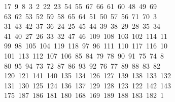 \begin{tabbing}
\>\ 17\ 9\ 8\ 3\ 2\ 22\ 23\ 54\ 55\ 67\ 66\ 61\ 60\ 48\ 49\ 69\ \\[0pt]
\ 63\ 62\ 53\ 52\ 59\ 58\ 65\ 64\ 51\ 50\ 57\ 56\ 71\ 70\ 3\\[0pt]
\ 31\ 43\ 42\ 37\ 36\ 24\ 25\ 45\ 44\ 39\ 38\ 29\ 28\ 35\ 34\\[0pt]
\>\ 41\ 40\ 27\ 26\ 33\ 32\ 47\ 46\ 109\ 108\ 103\ 102\ 114\ 11\\[0pt]
\ 99\ 98\ 105\ 104\ 119\ 118\ 97\ 96\ 111\ 110\ 117\ 116\ 10\\[0pt]
\ 101\ 113\ 112\ 107\ 106\ 85\ 84\ 79\ 78\ 90\ 91\ 75\ 74\ 8\\[0pt]
\ 80\ 95\ 94\ 73\ 72\ 87\ 86\ 93\ 92\ 76\ 77\ 89\ 88\ 83\ 82\\[0pt]
\>\ 120\ 121\ 141\ 140\ 135\ 134\ 126\ 127\ 139\ 138\ 133\ 132\\[0pt]
\>\ 131\ 130\ 125\ 124\ 136\ 137\ 129\ 128\ 123\ 122\ 142\ 143\ \\[0pt]
\ 175\ 187\ 186\ 181\ 180\ 168\ 169\ 189\ 188\ 183\ 182\ 1\\[0pt]

\end{tabbing}
